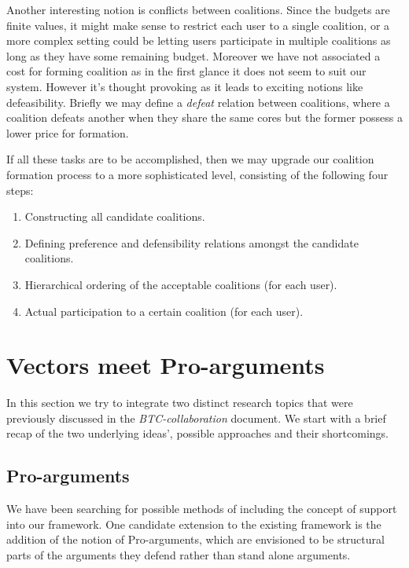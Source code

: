 \documentclass{article}
\begin{document}
Another interesting notion is conflicts between coalitions. Since the budgets are finite values, it might make sense to restrict each user to a single coalition, or a more complex setting could be letting users participate in multiple coalitions as long as they have some remaining budget. Moreover we have not associated a cost for forming coalition as in the first glance it does not seem to suit our system. However it's thought provoking as it leads to exciting notions like defeasibility. Briefly we may define a \emph{defeat} relation between coalitions, where a coalition defeats another when they share the same cores but the former possess a lower price for formation.

If all these tasks are to be accomplished, then we may upgrade our coalition formation process to a more sophisticated level, consisting of the following four steps:

\begin{enumerate}
\item Constructing  all candidate coalitions.
\item Defining preference and defensibility relations amongst the candidate coalitions.
\item  Hierarchical ordering of the acceptable coalitions (for each user).
\item Actual participation to a certain coalition (for each user).
\end{enumerate}





\section{Vectors meet Pro-arguments}

In this section we try to integrate two distinct research topics that were previously discussed in the \emph{BTC-collaboration} document. We start with a brief recap of the two underlying ideas', possible approaches and their shortcomings.

\subsection{Pro-arguments}

We have been searching for possible methods of including the concept of support into our framework. One candidate extension to the existing framework is the addition of the notion of Pro-arguments, which are envisioned to be structural parts of the arguments they defend rather than stand alone arguments.
\end{document}
